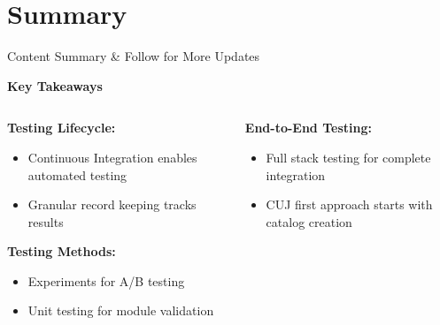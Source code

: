 \documentclass[aspectratio=169]{beamer}
\begin{document}
\section{Summary}

{
\begin{frame}{Content Summary \& Follow for More Updates}
  \begin{center}
    {\Large\textbf{\textcolor{GoogleBlue}{Key Takeaways}}}
  \end{center}
  
  
  
  \begin{columns}[T]
    \begin{column}{0.48\textwidth}
      \textbf{\textcolor{GoogleRed}{Testing Lifecycle:}}
      \begin{itemize}
        \item Continuous Integration enables automated testing
        \item Granular record keeping tracks results
      \end{itemize}
      
      
      
      \textbf{\textcolor{GoogleYellow}{Testing Methods:}}
      \begin{itemize}
        \item Experiments for A/B testing
        \item Unit testing for module validation
      \end{itemize}
    \end{column}
    
    \begin{column}{0.48\textwidth}
      \textbf{\textcolor{GoogleGreen}{End-to-End Testing:}}
      \begin{itemize}
        \item Full stack testing for complete integration
        \item CUJ first approach starts with catalog creation
      \end{itemize}
    \end{column}
  \end{columns}
  
  \vspace{0.8cm}
  
  \begin{center}
    \colorbox{GoogleBlue!20}{
      \begin{minipage}{0.9\textwidth}
        \centering
        

\end{minipage}}
\end{center}
\end{frame}}
\end{document}
